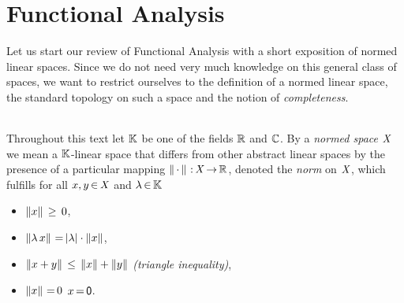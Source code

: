 \documentclass[11pt,twoside]{article}
\renewcommand*{\thepage}{(\roman{page})}
\begin{document}

\newpage
\thispagestyle{empty}
\setcounter{page}{1}
\renewcommand*{\thepage}{\arabic{page}}

\part{Functional Analysis}
Let us start our review of Functional Analysis with a short exposition
of normed linear spaces.
Since we do not need very much knowledge on this general class of spaces,
we want to restrict ourselves to the definition of a normed linear space,
the standard topology on such a space and the notion of \textit{completeness}.

\paragraph{}
Throughout this text let ${\mathbb{K}}$ be one of the fields ${\mathbb{R}}$ and ${\mathbb{C}}$.
By a \textit{normed space} $\mathit{X}$ we mean a ${\mathbb{K}}$-linear space
that differs from other abstract linear spaces
by the presence of a particular mapping $\left\lVert \,\cdot\, \right\rVert {\,:\,} \mathit{X} {\,\to\,} {\mathbb{R}}$,
denoted the \textit{norm} on $\mathit{X}$,
which fulfills for all $x,y {\,\in\,} \mathit{X}$ and $\lambda {\,\in\,} {\mathbb{K}}$

\begin{itemize}[leftmargin=40pt,itemsep=2pt]
\item[(N-1)]
$\left\lVert x \right\rVert \, \geq \, 0$,

\item[(N-2)]
$\norm{\lambda \, x} \eq \abs{\lambda} \cdot \norm{x}$,

\item[(N-3)]
$\left\lVert x+y \right\rVert \, \leq \, \left\lVert x \right\rVert + \left\lVert y \right\rVert$
\; \textit{(triangle inequality)},

\item[(N-4)]
$\left\lVert x \right\rVert {\,=\,} 0$ \iff $x {\,=\,} {\mathsf{0}}$.
\end{itemize}
\end{document}
